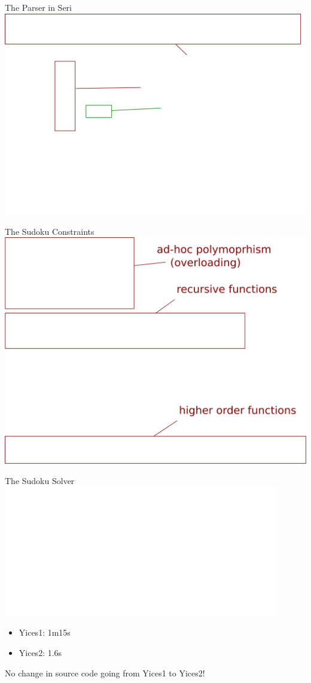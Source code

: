 \documentclass{beamer}
\begin{document}
\begin{frame}{The Parser in Seri}
\includegraphics[width=\textwidth]{parser8}
\end{frame}

\begin{frame}{The Sudoku Constraints}
\includegraphics[width=\textwidth]{isvalid10}
\end{frame}

\begin{frame}{The Sudoku Solver}
\includegraphics[width=0.9\textwidth]{main3}
\begin{itemize}
\item Yices1: 1m15s
\item Yices2: 1.6s
\end{itemize}
\alert{No change in source code going from Yices1 to Yices2!}
\end{frame}
\end{document}
